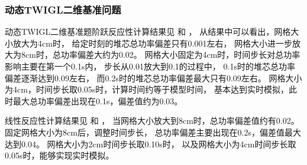 \subsubsection{动态TWIGL二维基准问题}

动态TWIGL二维基准题阶跃反应性计算结果见
和
，
从结果中可以看出，网格大小放大为4cm时，
给定时刻的堆芯总功率偏差只有0.001左右，
网格大小进一步放大为8cm时，总功率偏差大约为0.02。
网格大小固定为4cm时，时间步长对总功率影响主要在第一个0.1s内，
步长从0.01放大到0.1的过程中，
0.1s时的堆芯总功率偏差逐渐达到0.09左右，
而0.2s时的堆芯总功率偏差最大只有0.09左右。
网格大小为4cm，时间步长取0.05s时，计算时间约等于模型时间，
基本达到实时模拟，此时最大总功率偏差出现在0.1s，偏差值约为0.03。

线性反应性计算结果见
和
，
当网格大小放大到8cm时，总功率偏差值约有0.02。
固定网格大小为8cm后，调整时间步长，
总功率偏差主要出现在0.2s，偏差值最大达到0.04。
网格大小为2cm时间步长取0.10s时，
以及网格大小为4cm时间步长取0.05s时，能够实现实时模拟。


